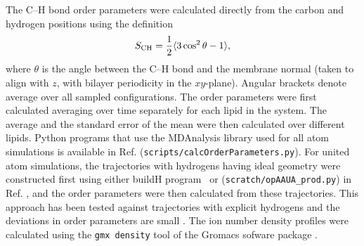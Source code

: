 \documentclass[aps,prl,superscriptaddress,twocolumn]{revtex4}
\begin{document}
The C--H bond order parameters were calculated directly
from the carbon and hydrogen positions using the definition
\begin{equation}
S_{\rm CH}=\frac{1}{2}\langle 3\cos^2\theta -1 \rangle,
\end{equation}
where $\theta$ is the angle between the C--H bond and the membrane normal
(taken to align with $z$, with bilayer periodicity in the $xy$-plane).
Angular brackets denote average over all sampled configurations.
The order parameters were first calculated averaging over time separately
for each lipid in the system. The average and
the standard error of the mean were then calculated over different lipids.
Python programs that use the MDAnalysis library \cite{agrawal11,gowers16}
used for all atom simulations is available in Ref. 
({\tt scripts/calcOrderParameters.py}). For united atom simulations, the trajectories
with hydrogens having ideal geometry were constructed first using either buildH program~\cite{buildH}
or ({\tt scratch/opAAUA\_prod.py}) in  Ref. , and the order parameters were
then calculated from these trajectories. This approach has been tested against trajectories
with explicit hydrogens and the deviations in order parameters are small \cite{buildH,piggot18}.
The ion number density profiles were calculated using the {\tt gmx density} tool
of the Gromacs sofware package \cite{gromacsMANUAL}.
\end{document}
